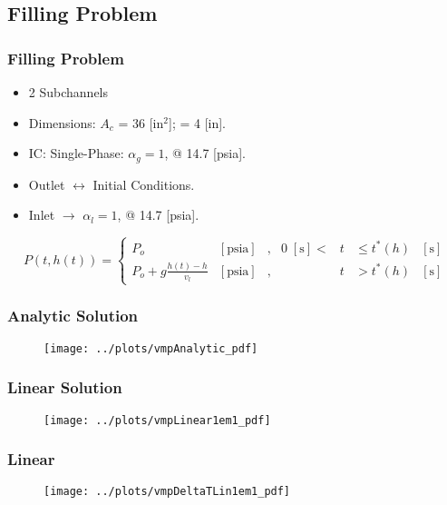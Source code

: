 \documentclass[compress,xcolor=table]{beamer}
\begin{document}
\subsection[Filling Problem]{Filling Problem}
\begin{frame}
\frametitle{Filling Problem}

\begin{itemize}
\item{2 Subchannels}
\item{Dimensions: $A_{c}$ = 36 [in$^2$]; \dx{} = 4 [in].}
\item{IC: Single-Phase: $\alpha_{g} = 1$, @ 14.7 [psia].}
\item{Outlet $\longleftrightarrow$ Initial Conditions.}
\item{Inlet $\rightarrow$ $\alpha_{l}=1$, @ 14.7 [psia].}
\end{itemize}
\begin{equation*}
P(t, h(t))= 
 \left\{
\begin{array}{cclrcll}
P_o & [ \text{psia} ] & , & 0\; [\text{s}] < & t & \leq t^{*}(h) & [\text{s}] \\
P_o + g \frac{ h(t) - h }{ v_{l} } & [ \text{psia} ] & , &  & t & > t^{*}(h) & [\text{s}]
\end{array}\right.
\end{equation*}

\end{frame}
\begin{frame}
\frametitle{Analytic Solution}

\begin{figure}[h!t]
\centering
\texttt{[image: ../plots/vmpAnalytic\_pdf]}
\end{figure}

\end{frame}
\begin{frame}
\frametitle{Linear Solution}

\begin{figure}[h!t]
\centering
\texttt{[image: ../plots/vmpLinear1em1\_pdf]}
\end{figure}

\end{frame}
\begin{frame}
\frametitle{Linear \dtmax{}}

\begin{figure}[h!t]
\centering
\texttt{[image: ../plots/vmpDeltaTLin1em1\_pdf]}
\end{figure}

\end{frame}
\end{document}
